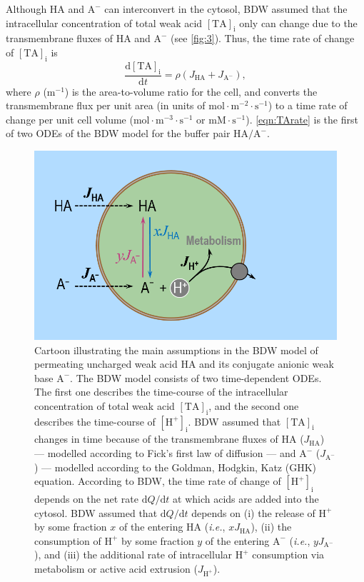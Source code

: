 \documentclass[fleqn,10pt]{physiome}
\begin{document}
Although $\mathrm{HA}$ and $\mathrm{A^-}$ can interconvert in the cytosol, BDW assumed that the intracellular concentration of total weak acid $\mathrm{[TA]_i}$ only can change due to the transmembrane fluxes of $\mathrm{HA}$ and $\mathrm{A^-}$ (see \autoref{fig:3}). Thus, the time rate of change of $\mathrm{[TA]_i}$ is
\begin{equation}
\dfrac{\mathrm{d[TA]_i}}{\mathrm{d}t}=\rho\left(J_\mathrm{HA}+J_\mathrm{A^-}\right),
\label{eqn:TArate}
\end{equation}
where $\rho$ ($\mathrm{m^{-1}}$) is the area-to-volume ratio for the cell, and converts the transmembrane flux per unit area (in units of $\mathrm{mol\cdot m^{-2}\cdot s^{-1}}$) to a time rate of change per unit cell volume ($\mathrm{mol\cdot m^{-3}\cdot s^{-1}}$ or $\mathrm{mM\cdot s^{-1}}$). \autoref{eqn:TArate} is the first of two ODEs of the BDW model for the buffer pair $\mathrm{HA}/\mathrm{A^-}$.

\begin{figure}[ht]
\centering
\includegraphics[width=0.5\linewidth]{img/Figure 3.png}
\caption{\label{fig:3} Cartoon illustrating the main assumptions in the BDW model of permeating uncharged weak acid $\mathrm{HA}$ and its conjugate anionic weak base $\mathrm{A^-}$. The BDW model consists of two time-dependent ODEs. The first one describes the time-course of the intracellular concentration of total weak acid $\mathrm{[TA]_i}$, and the second one describes the time-course of $\mathrm{[H^+]_i}$. BDW assumed that $\mathrm{[TA]_i}$ changes in time because of the transmembrane fluxes of $\mathrm{HA}$ ($J_\mathrm{HA}$) --- modelled according to Fick's first law of diffusion --- and $\mathrm{A^-}$ ($J_\mathrm{A^-}$) --- modelled according to the Goldman, Hodgkin, Katz (GHK) equation. According to BDW, the time rate of change of $\mathrm{[H^+]_i}$ depends on the net rate $\mathrm{d}Q/\mathrm{d}t$ at which acids are added into the cytosol. BDW assumed that $\mathrm{d}Q/\mathrm{d}t$ depends on (i) the release of $\mathrm{H^+}$ by some fraction $x$ of the entering $\mathrm{HA}$ (\emph{i.e.}, $xJ_\mathrm{HA}$), (ii) the consumption of $\mathrm{H^+}$ by some fraction $y$ of the entering $\mathrm{A^-}$ (\emph{i.e.}, $yJ_\mathrm{A^-}$), and (iii) the additional rate of intracellular $\mathrm{H^+}$ consumption via metabolism or active acid extrusion ($J_\mathrm{H^+}$).}
\end{figure}
\end{document}
